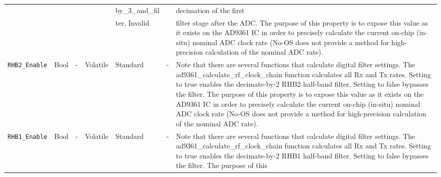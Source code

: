 \documentclass{article}
\begin{document}
\begin{landscape}
\begin{scriptsize}
\begin{longtable}{|p{3.6cm}|p{8.1cm}|p{1.4cm}|p{1.3cm}|p{1.4cm}|p{2.5cm}|p{3.6cm}|}
			                              &      &   &          & by\_3\_and\_fil  &   &  decimation of the first \\
			                              &      &   &          & ter, Invalid &   &  filter stage after
                                                the ADC. The purpose of this
                                                property is to expose this value
                                                as it exists on the AD9361 IC
                                                in order to precisely calculate
                                                the current on-chip (in-situ)
                                                nominal ADC clock rate (No-OS
                                                does not provide a method for
                                                high-precision calculation of
                                                the nominal ADC rate). \\
			\hline
			\verb+RHB2_Enable+ & Bool & - & Volatile & Standard & - &
                               Note that there are several
                                 functions that calculate digital filter
                                 settings. The ad9361\_calculate\_rf\_clock\_chain
                                 function calculates all Rx and Tx rates.
                                 Setting to true enables the decimate-by-2
                                 RHB2 half-band filter. Setting to false
                                 bypasses the filter. The purpose of this
                                 property is to expose this value as it exists
                                 on the AD9361 IC in order to precisely
                                 calculate the current on-chip (in-situ) nominal
                                 ADC clock rate (No-OS does not provide a method
                                 for high-precision calculation of the nominal
                                 ADC rate). \\
			\hline
			\verb+RHB1_Enable+ & Bool & - & Volatile & Standard & - &
                               Note that there are several
                                 functions that calculate digital filter
                                 settings. The ad9361\_calculate\_rf\_clock\_chain
                                 function calculates all Rx and Tx rates.
                                 Setting to true enables the decimate-by-2
                                 RHB1 half-band filter. Setting to false
                                 bypasses the filter. The purpose of this

\end{longtable}
\end{scriptsize}
\end{landscape}
\end{document}
